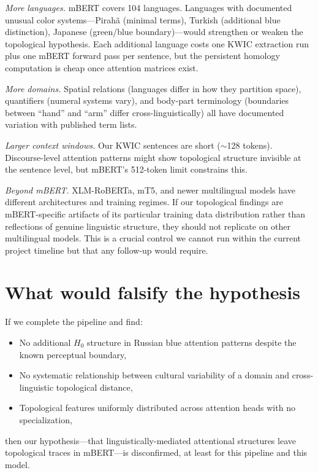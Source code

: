 \emph{More languages.} mBERT covers 104 languages. Languages with documented unusual color systems---Pirah\~{a} (minimal terms), Turkish (additional blue distinction), Japanese (green/blue boundary)---would strengthen or weaken the topological hypothesis. Each additional language costs one KWIC extraction run plus one mBERT forward pass per sentence, but the persistent homology computation is cheap once attention matrices exist.

\emph{More domains.} Spatial relations (languages differ in how they partition space), quantifiers (numeral systems vary), and body-part terminology (boundaries between ``hand'' and ``arm'' differ cross-linguistically) all have documented variation with published term lists.

\emph{Larger context windows.} Our KWIC sentences are short ($\sim$128 tokens). Discourse-level attention patterns might show topological structure invisible at the sentence level, but mBERT's 512-token limit constrains this.

\emph{Beyond mBERT.} XLM-RoBERTa, mT5, and newer multilingual models have different architectures and training regimes. If our topological findings are mBERT-specific artifacts of its particular training data distribution rather than reflections of genuine linguistic structure, they should not replicate on other multilingual models. This is a crucial control we cannot run within the current project timeline but that any follow-up would require.

\section{What would falsify the hypothesis}

If we complete the pipeline and find:
\begin{itemize}
  \item No additional $H_0$ structure in Russian blue attention patterns despite the known perceptual boundary,
  \item No systematic relationship between cultural variability of a domain and cross-linguistic topological distance,
  \item Topological features uniformly distributed across attention heads with no specialization,
\end{itemize}
then our hypothesis---that linguistically-mediated attentional structures leave topological traces in mBERT---is disconfirmed, at least for this pipeline and this model.

